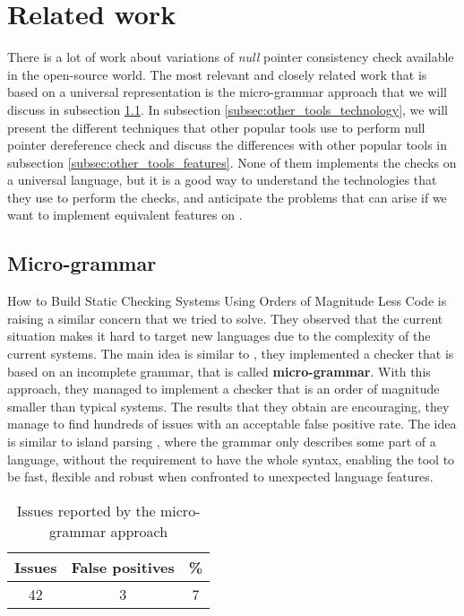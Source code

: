 \section{Related work}
\label{sec:related_work}

There is a lot of work about variations of \emph{null} pointer consistency check available in the open-source world.
The most relevant and closely related work that is based on a universal representation is the micro-grammar approach \cite{Brown:2016:BSC:2954679.2872364} that we will discuss in subsection \ref{subsec:micro_grammar}.
In subsection \ref{subsec:other_tools_technology}, we will present the different techniques that other popular tools use to perform null pointer dereference check and discuss the differences with other popular tools in subsection \ref{subsec:other_tools_features}.
None of them implements the checks on a universal language, but it is a good way to understand the technologies that they use to perform the checks, and anticipate the problems that can arise if we want to implement equivalent features on \slang{}.

\subsection{Micro-grammar}
\label{subsec:micro_grammar}

How to Build Static Checking Systems Using Orders of Magnitude Less Code \cite{Brown:2016:BSC:2954679.2872364} is raising a similar concern that we tried to solve. 
They observed that the current situation makes it hard to target new languages due to the complexity of the current systems. 
The main idea is similar to \slang{}, they implemented a checker that is based on an incomplete grammar, that is called \textbf{micro-grammar}.
With this approach, they managed to implement a checker that is an order of magnitude smaller than typical systems.
The results that they obtain are encouraging, they manage to find hundreds of issues with an acceptable false positive rate. 
The idea is similar to island parsing \cite{Moonen:2001}, where the grammar only describes some part of a language, without the requirement to have the whole syntax, enabling the tool to be fast, flexible and robust when confronted to unexpected language features.

\begin{table}[h]
	\centering
	\caption{Issues reported by the micro-grammar approach}
	\label{table:micro_grammar_issues}
	\begin{tabular}{|c|c|c|}
		\hline
		\bf Issues & \bf False positives & \bf \% \\ \hline
		42 &  3 &  7 \\ \hline
	\end{tabular}
\end{table}

